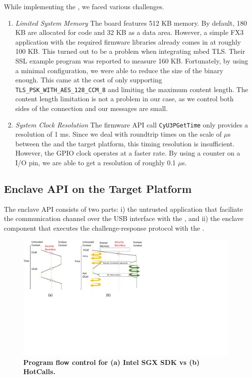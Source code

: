   
 While implementing the \device, we faced various challenges.

\begin{enumerate}
  \item \emph{Limited System Memory} The board features 512 KB memory. By default, 180 KB are allocated for code and 32 KB as a data area. However, a simple FX3 application with the required firmware libraries already comes in at roughly 100 KB. This turned out to be a problem when integrating mbed TLS. Their SSL example program was reported to measure 160 KB. Fortunately, by using a minimal configuration, we were able to reduce the size of the binary enough. This came at the cost of only supporting \texttt{TLS\_PSK\_WITH\_AES\_128\_CCM\_8} and limiting the maximum content length. The content length limitation is not a problem in our case, as we control both sides of the connection and our messages are small.

 \item \emph{System Clock Resolution} The firmware API call \texttt{CyU3PGetTime} only provides a resolution of 1 ms. Since we deal with roundtrip times on the scale of $\mu$s between the \device and the target platform, this timing resolution is insufficient. However, the GPIO clock operates at a faster rate. By using a counter on a I/O pin, we are able to get a resolution of roughly 0.1 $\mu$s.
  
\end{enumerate}

\subsection{\name Enclave API on the Target Platform} 

The \name enclave API consists of two parts: i) the untrusted application that faciliate the communication channel over the USB interface with the \device, and ii) the enclave component that executes the challenge-response protocol with the \device.

\begin{figure}[t]
  \centering
    \includegraphics[width=\linewidth]{chapters/ProximiTEE/images/hotcalls.pdf}
    \caption[Program flow control for Intel SGX SDK vs HotCalls]{\textbf{Program flow control for (a) Intel SGX SDK vs (b) HotCalls.} }
    \label{fig:hotcalls}
\end{figure}

